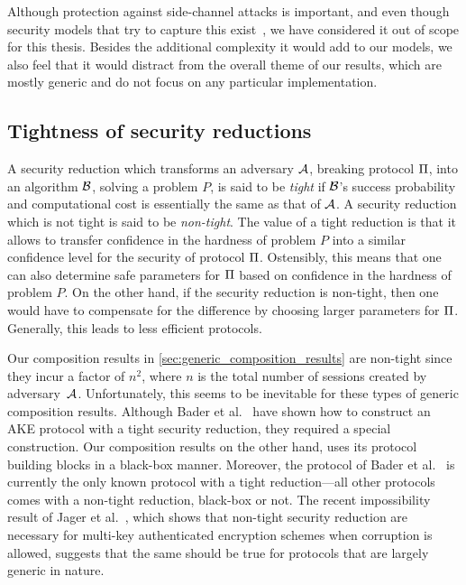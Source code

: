 Although protection against side-channel attacks is important,
and even though security models that try to capture this exist~\cite{ASIACCS:AlaSteBoy14},
we have considered it out of scope for this thesis.
Besides the additional complexity it would add to our models,
we also feel that it would distract from the overall theme of our results,
which are mostly generic and do not focus on any particular implementation.





 

\subsection{Tightness of security reductions}
A security reduction which transforms an adversary $\A$,
breaking protocol $\protocol$,
into an algorithm $\A[B]$,
solving a problem $P$,
is said to be \emph{tight} if $\A[B]$'s success probability and computational cost is essentially the same as that of $\A$.
A security reduction which is not tight is said to be \emph{non-tight}.
The value of a tight reduction is that it allows to transfer  confidence in the hardness of problem $P$  into a similar confidence level for the security of protocol $\protocol$.
Ostensibly,
this means that one can also determine safe parameters for $\protocol$ based on confidence in the hardness of problem $P$.
On the other hand,
if the security reduction is non-tight,
then one would have to compensate for the difference by choosing larger parameters for $\protocol$.
Generally,
this leads to less efficient protocols.

Our composition results in \cref{sec:generic_composition_results} are non-tight since they incur a factor of $n^2$,
where $n$ is the total number of sessions created by adversary~$\A$.
Unfortunately,
this seems to be inevitable for these types of generic composition results.
Although Bader et al.~\cite{TCC:BHJKL15} have  shown how to construct an AKE protocol with a tight security reduction,
they required a special construction.
Our composition results on the other hand,
uses its protocol building blocks in a black-box manner.
Moreover,
the protocol of Bader et al.~\cite{TCC:BHJKL15} is currently the only known protocol with a tight reduction---all 
other protocols comes with a non-tight reduction,
black-box or not.
The recent impossibility result of Jager et al.~\cite{EPRINT:JSSW17},
which shows that non-tight security reduction are necessary for multi-key authenticated encryption schemes when corruption is allowed,
suggests that the same should be true for protocols that are largely generic in nature.


